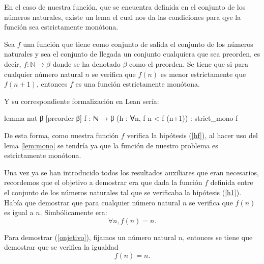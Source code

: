 \begin{demostracion}
  En el caso de nuestra función, que se encuentra definida en el conjunto
  de los números naturales, existe un lema el cual nos da las condiciones
  para qye la función sea estrictamente monótona.

  \begin{lema}\label{lem:mono}
    Sea \(f\) una función que tiene como conjunto de salida el conjunto
    de los números naturales y sea el conjunto de llegada un conjunto
    cualquiera que sea preorden, es decir, \(f:ℕ → β\) donde se ha
    denotado \(β\) como el preorden. Se tiene que si para cualquier
    número natural \(n\) se verifica que \(f(n)\) es menor estrictamente
    que \(f(n+1)\), entonces \(f\) es una función estrictamente monótona.
  \end{lema}

  Y su correspondiente formalización en Lean sería:
  \begin{leancode}
    lemma nat {β} [preorder β] {f : ℕ → β} (h : ∀n, f n < f (n+1)) :
    strict_mono f
  \end{leancode}

  De esta forma, como nuestra función \(f\) verifica la hipótesis
  (\ref{hf}), al hacer uso del lema \ref{lem:mono} se tendría ya que la
  función de nuestro problema es estrictamente monótona.

  Una vez ya se han introducido todos los resultados auxiliares que eran
  necesarios, recordemos que el objetivo a demostrar era que dada la
  función \(f\) definida entre el conjunto de los números naturales tal
  que se verificaba la hipótesis (\ref{h1}). Había que demostrar que
  para cualquier número natural \(n\) se verifica que \(f(n)\) es igual
  a \(n\). Simbólicamente era:
  \begin{equation}\label{objetivo}
    ∀n, f(n)=n.
  \end{equation}

  Para demostrar (\ref{onjetivo}), fijamos un número natural \(n\),
  entonces se tiene que demostrar que se verifica la igualdad
  \begin{equation}\label{objetivo2}
    f(n)=n.
  \end{equation}
\end{demostracion}

